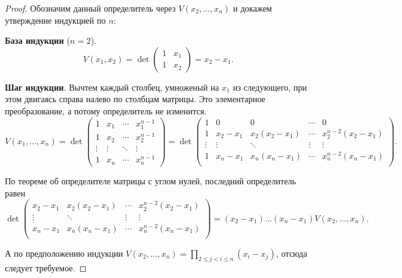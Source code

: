 \begin{proof}
    Обозначим данный определитель через $V(x_2, \ldots, x_n)$ и докажем утверждение индукцией по $n$:

    \textbf{База индукции} ($n = 2$). 
    $$
    V(x_1, x_2) = 
    \det
    \begin{pmatrix}
        1 & x_1\\
        1 & x_2
    \end{pmatrix} = x_2 - x_1.
    $$

    \textbf{Шаг индукции}. Вычтем каждый столбец, умноженый на $x_1$ из следующего, при этом двигаясь справа налево по столбцам матрицы. Это элементарное преобразование, а потому определитель не изменится.
    $$
    V(x_1, \ldots, x_n) = 
    \det
    \begin{pmatrix}
        1 & x_1 & \cdots & x_1^{n - 1}\\
        1 & x_2 & \cdots & x_2^{n - 1}\\
        \vdots & \vdots & \ddots & \vdots\\
        1 & x_n & \cdots & x_n^{n - 1}
    \end{pmatrix} = 
    \det
    \begin{pmatrix}
        1 & 0 & 0 & \cdots & 0\\
        1 & x_2 - x_1 & x_2(x_2 - x_1) & \cdots & x_2^{n - 2}(x_2 - x_1)\\
        \vdots & \vdots & \ddots & \vdots & \vdots\\
        1 & x_n - x_1 & x_n(x_n - x_1) & \cdots & x_n^{n - 2}(x_n - x_1)\\
    \end{pmatrix}.
    $$

    По теореме об определителе матрицы с углом нулей, последний определитель равен
    $$
    \det
    \begin{pmatrix}
        x_2 - x_1 & x_2(x_2 - x_1) & \cdots & x_2^{n - 2}(x_2 - x_1)\\
        \vdots & \ddots & \vdots & \vdots\\
        x_n - x_1 & x_n(x_n - x_1) & \cdots & x_n^{n - 2}(x_n - x_1)\\
    \end{pmatrix} = (x_2 - x_1) \ldots (x_n - x_1)V(x_2, \ldots, x_n).
    $$

    А по предположению индукции $\displaystyle V(x_2, \ldots, x_n) = \prod_{2 \leqslant j < i \leqslant n}(x_i - x_j)$, отсюда следует требуемое.
\end{proof}

